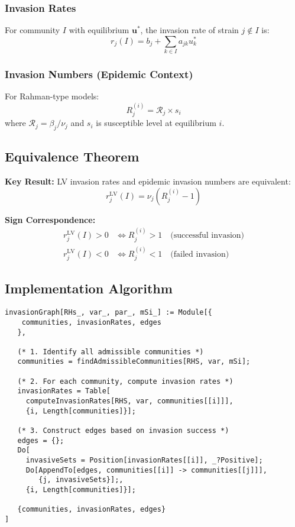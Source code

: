 \documentclass{article}
\begin{document}
\subsubsection{Invasion Rates}
For community $I$ with equilibrium $\mathbf{u}^*$, the invasion rate of strain $j \notin I$ is:
$$r_j(I) = b_j + \sum_{k \in I} a_{jk} u_k^*$$

\subsubsection{Invasion Numbers (Epidemic Context)}
For Rahman-type models:
$$R_j^{(i)} = \mathcal{R}_j \times s_i$$
where $\mathcal{R}_j = \beta_j/\nu_j$ and $s_i$ is susceptible level at equilibrium $i$.

\subsection{Equivalence Theorem}

\textbf{Key Result:} LV invasion rates and epidemic invasion numbers are equivalent:
$$r_j^{\text{LV}}(I) = \nu_j(R_j^{(i)} - 1)$$

\textbf{Sign Correspondence:}
\begin{align}
r_j^{\text{LV}}(I) > 0 &\Leftrightarrow R_j^{(i)} > 1 \quad \text{(successful invasion)}\\
r_j^{\text{LV}}(I) < 0 &\Leftrightarrow R_j^{(i)} < 1 \quad \text{(failed invasion)}
\end{align}

\subsection{Implementation Algorithm}

\begin{lstlisting}
invasionGraph[RHs_, var_, par_, mSi_] := Module[{
    communities, invasionRates, edges
   },

   (* 1. Identify all admissible communities *)
   communities = findAdmissibleCommunities[RHS, var, mSi];

   (* 2. For each community, compute invasion rates *)
   invasionRates = Table[
     computeInvasionRates[RHS, var, communities[[i]]],
     {i, Length[communities]}];

   (* 3. Construct edges based on invasion success *)
   edges = {};
   Do[
     invasiveSets = Position[invasionRates[[i]], _?Positive];
     Do[AppendTo[edges, communities[[i]] -> communities[[j]]],
        {j, invasiveSets}];,
     {i, Length[communities]}];

   {communities, invasionRates, edges}
]
\end{lstlisting}
\end{document}
